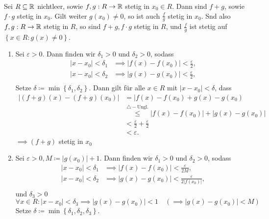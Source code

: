 \begin{subtheorem}
	Sei $ R \subseteq \mathbb{R}  $ nichtleer, sowie $ f,g: R \to \mathbb{R}  $ stetig in $ x_0 \in R $.
	Dann sind $ f+g $, sowie $ f\cdot g $ stetig in $ x_0 $.
	Gilt weiter $ g(x_0) \neq 0 $, so ist auch $ \frac{ f }{ g }  $ stetig in $ x_0 $.
	Snd also $ f,g: R\to \mathbb{R}  $ stetig in $ R $, so sind $ f+g, f\cdot g $ stetig in $ R $,
	und $ \frac{ f }{ g }  $ ist stetig auf $ \left\{ x \in R: g(x) \neq 0 \right\}  $.
\end{subtheorem}

\begin{subproof*}[Theorem 7.2.7.]
	\begin{enumerate}[label=(\roman*)]
		\item Sei $ \varepsilon > 0 $. Dann finden wir $ \delta_1 > 0 $ und $ \delta_2 > 0 $, sodass
			\begin{align*}
				|x - x_0| < \delta_1 &\implies |f(x) - f(x_0) | < \frac{ \varepsilon  }{ 2 } , \\
				|x - x_0| < \delta_2 &\implies |g(x) - g(x_0) | < \frac{ \varepsilon  }{ 2 } , \\
			\end{align*}
			Setze $ \delta \coloneqq \min \left\{ \delta_1, \delta_2 \right\}  $. 
			Dann gilt für alle $ x \in R $ mit $ |x-x_0| < \delta $, dass
			\begin{align*}
				| (f+g)(x) - (f+g)(x_0) | &= | f(x) - f(x_0) + g(x) - g(x_0) \\
				~&\overset{\triangle-\text{Ungl.} }{\leq } | f(x) - f(x_0)| + |g(x) - g(x_0)| \\
				~&< \frac{ \varepsilon  }{ 2 } + \frac{ \varepsilon  }{ 2 } \\
				~&< \varepsilon .
			\end{align*}
			$ \implies (f+g) $ stetig in $ x_0 $
		\item Sei $ \varepsilon > 0, M \coloneqq | g(x_0) | + 1 $.
			Dann finden wir $ \delta_1 > 0 $ und $ \delta_2 > 0 $, sodass
			\begin{align*}
				|x - x_0| < \delta_1 &\implies |f(x) - f(x_0) | < \frac{ \varepsilon  }{ 2M } , \\
				|x - x_0| < \delta_2 &\implies |g(x) - g(x_0) | < \frac{ \varepsilon  }{ 2|f(x_0)| } , \\
			\end{align*}
			und $ \delta_3 > 0 $
			\[
				\forall x \in R : | x - x_0 | < \delta_3 \implies  | g(x) - g(x_0) | < 1 \quad ( \implies  | g(x) - g(x_0) | < M )
			\]
			Setze $ \delta \coloneqq \min \left\{ \delta_1, \delta_2, \delta_3 \right\}  $.

\end{enumerate}
\end{subproof*}
